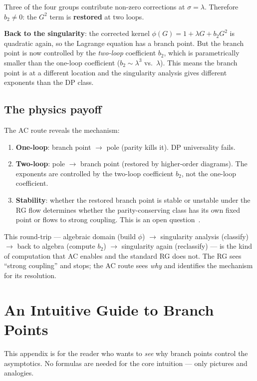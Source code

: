 \documentclass[11pt,a4paper]{article}
\theoremstyle{definition}
\begin{document}
Three of the four groups contribute non-zero corrections at $\sigma = \lambda$.
Therefore $b_2 \neq 0$: the $G^2$ term is \textbf{restored} at two loops.

\textbf{Back to the singularity}: the corrected kernel
$\phi(G) = 1 + \lambda G + b_2 G^2$ is quadratic again, so the Lagrange
equation has a branch point. But the branch point is now controlled by
the \emph{two-loop} coefficient $b_2$, which is parametrically smaller
than the one-loop coefficient ($b_2 \sim \lambda^3$ vs.\ $\lambda$).
This means the branch point is at a different location and the singularity
analysis gives different exponents than the DP class.

\subsection{The physics payoff}

The AC route reveals the mechanism:
\begin{enumerate}
\item \textbf{One-loop}: branch point $\to$ pole (parity kills it).
      DP universality fails.
\item \textbf{Two-loop}: pole $\to$ branch point (restored by
      higher-order diagrams). The exponents are controlled by the
      two-loop coefficient $b_2$, not the one-loop coefficient.
\item \textbf{Stability}: whether the restored branch point is
      stable or unstable under the RG flow determines whether the
      parity-conserving class has its own fixed point or flows to
      strong coupling. This is an open question~\cite{hinrichsen2001}.
\end{enumerate}

This round-trip --- algebraic domain (build $\phi$) $\to$ singularity
analysis (classify) $\to$ back to algebra (compute $b_2$) $\to$
singularity again (reclassify) --- is the kind of computation that
AC enables and the standard RG does not. The RG sees ``strong coupling''
and stops; the AC route sees \emph{why} and identifies the mechanism for
its resolution.

\section{An Intuitive Guide to Branch Points}
\label{app:intuitive}

This appendix is for the reader who wants to \emph{see} why
branch points control the asymptotics. No formulas are needed for the
core intuition --- only pictures and analogies.
\end{document}
